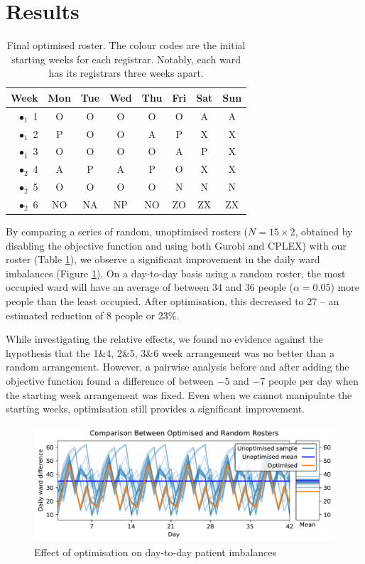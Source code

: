 \documentclass[a4paper]{article}
\begin{document}
\section{Results}
\begin{table}[H]
\centering
\caption{Final optimised roster. The colour codes are the initial starting weeks for each registrar. Notably, each ward has its registrars three weeks apart.}
\label{tab:roster}
\begin{tabular}{r|ccccccc}
Week	&Mon	&Tue	&Wed	&Thu	&Fri	&Sat	&Sun	\\
\hline
{\color{LIME}$\bullet_1$} 1	& O	& O	& O	& O	& O	& A	& A	\\
{\color{NAVY}$\bullet_1$} 2	& P	& O	& O	& A	& P	& X	& X	\\
{\color{YELLOW}$\bullet_1$} 3	& O	& O	& O	& O	& A	& P	& X	\\
{\color{LIME}$\bullet_2$} 4	& A	& P	& A	& P	& O	& X	& X	\\
{\color{NAVY}$\bullet_2$} 5	& O	& O	& O	& O	& N	& N	& N	\\
{\color{YELLOW}$\bullet_2$} 6	& NO	& NA	& NP	& NO	& ZO	& ZX	& ZX	\\
\end{tabular}
\end{table}

By comparing a series of random, unoptimised rosters ($N=15\times 2$, obtained by disabling the objective function and using both Gurobi and CPLEX) with our roster (Table \ref{tab:roster}), we observe a significant improvement in the daily ward imbalances (Figure \ref{fig:comparison}). On a day-to-day basis using a random roster, the most occupied ward will have an average of between 34 and 36 people ($\alpha = 0.05$) more people than the least occupied. After optimisation, this decreased to 27 -- an estimated reduction of 8 people or 23\%.

While investigating the relative effects, we found no evidence against the hypothesis that the 1\&4, 2\&5, 3\&6 week arrangement was no better than a random arrangement. However, a pairwise analysis before and after adding the objective function found a difference of between $-5$ and $-7$ people per day when the starting week arrangement was fixed. Even when we cannot manipulate the starting weeks, optimisation still provides a significant improvement.

\begin{figure}[h]
    \centering\includegraphics[width=\linewidth]{../results/comparison}
    \caption{Effect of optimisation on day-to-day patient imbalances}
    \label{fig:comparison}
\end{figure}
\end{document}
